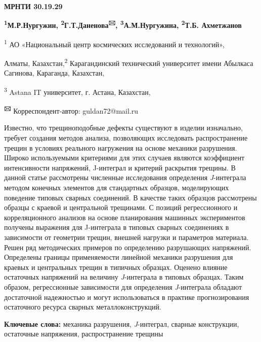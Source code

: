 \newpage
{\bfseries МРНТИ 30.19.29}


\begin{center}
{\bfseries \textsuperscript{1}М.Р.Нургужин, \textsuperscript{2}Г.Т.Даненова\textsuperscript{🖂}, \textsuperscript{3}А.М.Нургужина, \textsuperscript{2}Т.Б. Ахметжанов}

\textsuperscript{1} АО «Национальный центр космических исследований и
технологий»,

Алматы, Казахстан,\textsuperscript{2} Карагандинский технический
университет имени Абылкаса Сагинова, Караганда, Казахстан,

\textsuperscript{3} Astana IT университет, г. Астана, Казахстан,

{\bfseries \textsuperscript{🖂}} Корреспондент-автор: guldan72@mail.ru
\end{center}

Известно, что трещиноподобные дефекты существуют в изделии изначально,
требует создания методов анализа, позволяющих исследовать
распространение трещин в условиях реального нагружения на основе
механики разрушения. Широко используемыми критериями для этих случаев
являются коэффициент интенсивности напряжений, J-интеграл и критерий
раскрытия трещины. В данной статье рассмотрены численные исследования
определения \emph{J}-интеграла методом конечных элементов для
стандартных образцов, моделирующих поведение типовых сварных соединений.
В качестве таких образцов рассмотрены образцы с краевой и центральной
трещинами. С позиций регрессионного и корреляционного анализов на основе
планирования машинных экспериментов получены выражения для J-интеграла в
типовых сварных соединениях в зависимости от геометрии трещин, внешней
нагрузки и параметров материала. Решен ряд методических примеров по
определению разрушающих напряжений. Определены границы применяемости
линейной механики разрушения для краевых и центральных трещин в типичных
образцах. Оценено влияние остаточных напряжений на величину
\emph{J}-интеграла в типовых образцах. Таким образом, регрессионные
зависимости для определения \emph{J}-интеграла обладают достаточной
надежностью и могут использоваться в практике прогнозирования
остаточного ресурса сварных металлоконструкций.

{\bfseries Ключевые слова:} механика разрушения, \emph{J}-интеграл, сварные
конструкции, остаточные напряжения, распространение трещины

